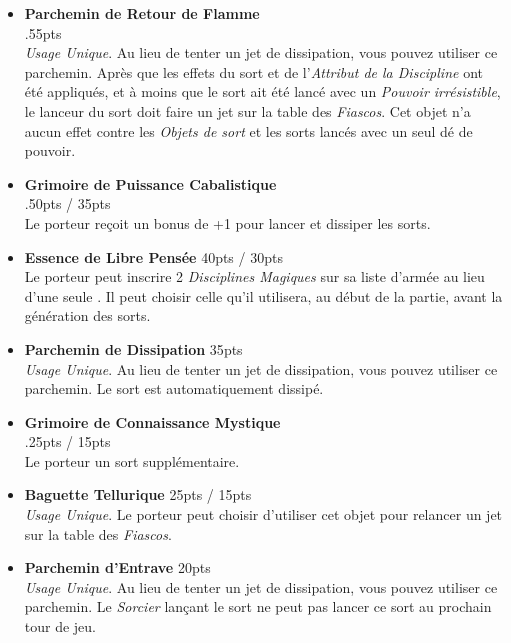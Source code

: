\begin{multicols}{2}
\begin{itemize}[label={-}]
\item \textbf{Parchemin de Retour de Flamme} \\ .\dotfill \unit{55}{pts} \\
\emph{Usage Unique}. Au lieu de tenter un jet de dissipation, vous pouvez utiliser ce parchemin. Après que les effets du sort et de l'\emph{Attribut de la Discipline} ont été appliqués, et à moins que le sort ait été lancé avec un \emph{Pouvoir irrésistible}, le lanceur du sort doit faire un jet sur la table des \emph{Fiascos}. Cet objet n'a aucun effet contre les \emph{Objets de sort} et les sorts lancés avec un seul dé de pouvoir.

\item \textbf{Grimoire de Puissance Cabalistique} \\ .\dotfill \unit{50}{pts} / \unit{35}{pts} \\
Le porteur reçoit un bonus de +1 pour lancer et dissiper les sorts.

\item \textbf{Essence de Libre Pensée} \dotfill \unit{40}{pts} / \unit{30}{pts} \\
Le porteur peut inscrire 2 \emph{Disciplines Magiques} sur sa liste d'armée au lieu d'une seule . Il peut choisir celle qu'il utilisera, au début de la partie, avant la génération des sorts.

\item \textbf{Parchemin de Dissipation} \dotfill \unit{35}{pts} \\
\emph{Usage Unique}. Au lieu de tenter un jet de dissipation, vous pouvez utiliser ce parchemin. Le sort est automatiquement dissipé.

\item \textbf{Grimoire de Connaissance Mystique} \\ .\dotfill \unit{25}{pts} / \unit{15}{pts} \\
Le porteur  un sort supplémentaire.

\item \textbf{Baguette Tellurique} \dotfill \unit{25}{pts} / \unit{15}{pts} \\
\emph{Usage Unique}. Le porteur peut choisir d'utiliser cet objet pour relancer un jet sur la table des \emph{Fiascos}.

\item \textbf{Parchemin d'Entrave} \dotfill \unit{20}{pts} \\
\emph{Usage Unique}. Au lieu de tenter un jet de dissipation, vous pouvez utiliser ce parchemin. Le \emph{Sorcier} lançant le sort ne peut pas lancer ce sort au prochain tour de jeu.


\end{itemize}
\end{multicols}
